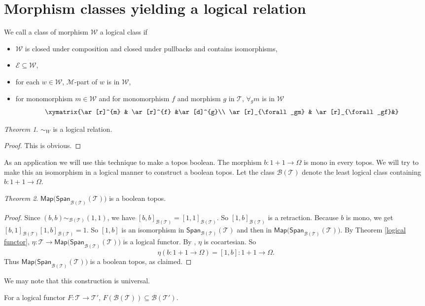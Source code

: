 \documentclass{tac}
\theoremstyle{definition}
\theoremstyle{remark}
\def\mc#1{\mathcal {#1}}
\def\B{\mc B}
\def\T{\mc T}
\def\E{\mc E}
\def\M{\mc M}
\def\W{\mc W}
\newtheorem{theorem}{Theorem}
\begin{document}
\section{Morphism classes yielding a logical relation}
\begin{definition}
	We call a class of morphism $\W$  a logical class if
	\begin{itemize}
		\item
		$\W$ is closed under composition and closed under pullbacks and contains isomorphisms,
		\item
		$\E\subseteq \W$,
		\item
		for each $w\in\W$, $\M$-part of $w$ is in $\W$,
		\item
		for monomorphism $m\in\W$ and for monomorphism $f$ and morphism $g$ in $\T$, $\forall_gm$ is in $\W$
		$$\xymatrix{\ar[r]^{m} & \ar[r]^{f} &\ar[d]^{g}\\
		\ar[r]_{\forall_gm} & \ar[r]_{\forall_gf}&}$$
	\end{itemize}
\end{definition}
\begin{theorem}
	$\sim_W$ is a logical relation.
\end{theorem}
\begin{proof}
	This is obvious.
\end{proof}
As an application we will use this technique to make a topos boolean. The morphism $b:1+1\rightarrow \Omega$ is mono in every topos. We will try to make this an isomorphism in a logical manner to construct a boolean topos.
Let the class $\B(\T)$ denote the least logical class containing $b:1+1\rightarrow \Omega$.
\begin{theorem}
	$\mathsf{Map(Span}_{\B(\T)}(\T))$ is a boolean topos.
\end{theorem}
\begin{proof}
	Since $(b,b)\sim_{\B(\T)}(1,1)$, we have $[b,b]_{\B(\T)}=[1,1]_{\B(\T)}$. So $[1,b]_{\B(\T)}$ is a retraction. Because $b$ is mono, we get $[b,1]_{\B(\T)}[1,b]_{\B(\T)}=1$. So $[1,b]$ is an isomorphism in $\mathsf{Span}_{\B(\T)}(\T)$ and then in $\mathsf{Map(Span}_{\B(\T)}(\T))$.
	By Theorem \ref{logical functor}, $\eta:\T\longrightarrow \mathsf{Map(Span}_{\B(\T)}(\T))$ is a logical functor. By  \cite[Corollary 2.2.10]{john}, $\eta$ is cocartesian. So
	$$\eta(b:1+1\rightarrow \Omega)=[1,b]:1+1\rightarrow \Omega.$$
	Thus $\mathsf{Map(Span}_{\B(\T)}(\T))$ is a boolean topos, as claimed.
\end{proof}
We may note that this construction is universal.
\begin{lemma}\label{FB(B"}
	For a logical functor $F:\T\rightarrow\T'$, $F(\B(\T))\subseteq\B(\T').$
\end{lemma}
\end{document}
